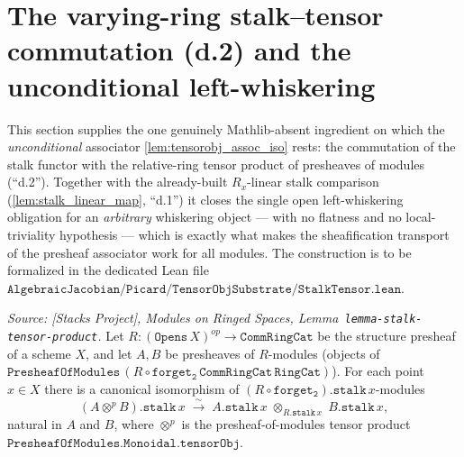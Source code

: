 \section{The varying-ring stalk--tensor commutation (d.2) and the unconditional
left-whiskering}
\label{sec:tensorobj_stalk_tensor}

This section supplies the one genuinely Mathlib-absent ingredient on which the
\emph{unconditional} associator \cref{lem:tensorobj_assoc_iso} rests: the commutation
of the stalk functor with the relative-ring tensor product of presheaves of modules
(``d.2''). Together with the already-built \(R_x\)-linear stalk comparison
(\cref{lem:stalk_linear_map}, ``d.1'') it closes the single open left-whiskering
obligation for an \emph{arbitrary} whiskering object --- with no flatness and no
local-triviality hypothesis --- which is exactly what makes the sheafification
transport of the presheaf associator work for all modules. The construction is to be
formalized in the dedicated Lean file
\(\mathtt{AlgebraicJacobian/Picard/TensorObjSubstrate/StalkTensor.lean}\).

\begin{lemma}

  \label{lem:stalk_tensor_commutation}
  \textit{Source: [Stacks Project], Modules on Ringed Spaces,
  Lemma~\texttt{lemma-stalk-tensor-product}.}
  Let \(R : (\mathtt{Opens}\,X)^{op} \to \mathtt{CommRingCat}\) be the structure
  presheaf of a scheme \(X\), and let \(A, B\) be presheaves of
  \(R\)-modules (objects of \(\mathtt{PresheafOfModules}\,(R \circ
  \mathtt{forget_2}\,\mathtt{CommRingCat}\,\mathtt{RingCat})\)). For each point
  \(x \in X\) there is a canonical isomorphism of \((R \circ
  \mathtt{forget_2}).\mathtt{stalk}\,x\)-modules
  \[
    (A \otimes^{p} B).\mathtt{stalk}\,x
      \;\xrightarrow{\ \sim\ }\;
    A.\mathtt{stalk}\,x \;\otimes_{R.\mathtt{stalk}\,x}\; B.\mathtt{stalk}\,x,
  \]
  natural in \(A\) and \(B\), where \(\otimes^{p}\) is the presheaf-of-modules tensor
  product \(\mathtt{PresheafOfModules.Monoidal.tensorObj}\).
\end{lemma}

